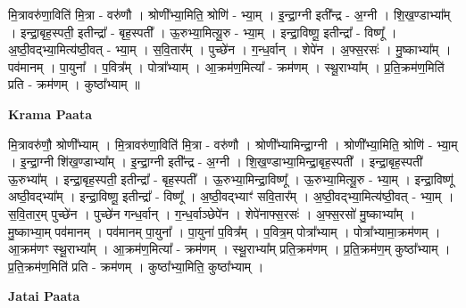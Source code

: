 \documentclass[17pt]{extarticle}
\begin{document}
मि॒त्रावरु॑णा॒विति॑ मि॒त्रा - वरु॑णौ । श्रोणी᳚भ्या॒मिति॒ श्रोणि॑ - भ्या॒म् । इ॒न्द्रा॒ग्नी इती᳚न्द्र - अ॒ग्नी । शि॒ख॒ण्डाभ्या᳚म् । इन्द्रा॒बृह॒स्पती॒ इतीन्द्रा᳚ - बृह॒स्पती᳚ । ऊ॒रुभ्या॒मित्यू॒रु - भ्या॒म् । इन्द्रा॒विष्णू॒ इतीन्द्रा᳚ - विष्णू᳚ । अ॒ष्ठी॒वद्भ्या॒मित्य॑ष्ठी॒वत् - भ्या॒म् । स॒वि॒तार᳚म् । पुच्छे॑न । ग॒न्ध॒र्वान् । शेपे॑न । अ॒फ्स॒रसः॑ । मु॒ष्काभ्या᳚म् । पव॑मानम् । पा॒युना᳚ । प॒वित्र᳚म् । पोत्रा᳚भ्याम् । आ॒क्रम॑ण॒मित्या᳚ - क्रम॑णम् । स्थू॒राभ्या᳚म् । प्र॒ति॒क्रम॑ण॒मिति॑ प्रति - क्रम॑णम् । कुष्ठा᳚भ्याम् ॥  \newline


\textbf{Krama Paata} \newline

मि॒त्रावरु॑णौ॒ श्रोणी᳚भ्याम् । मि॒त्रावरु॑णा॒विति॑ मि॒त्रा - वरु॑णौ । श्रोणी᳚भ्यामिन्द्रा॒ग्नी । श्रोणी᳚भ्या॒मिति॒ श्रोणि॑ - भ्या॒म् । इ॒न्द्रा॒ग्नी शि॑ख॒ण्डाभ्या᳚म् । इ॒न्द्रा॒ग्नी इती᳚न्द्र - अ॒ग्नी । शि॒ख॒ण्डाभ्या॒मिन्द्रा॒बृह॒स्पती᳚ । इन्द्रा॒बृह॒स्पती॑ ऊ॒रुभ्या᳚म् । इन्द्रा॒बृह॒स्पती॒ इतीन्द्रा᳚ - बृह॒स्पती᳚ । ऊ॒रुभ्या॒मिन्द्रा॒विष्णू᳚ । ऊ॒रुभ्या॒मित्यू॒रु - भ्या॒म् । इन्द्रा॒विष्णू॑ अष्ठी॒वद्भ्या᳚म् । इन्द्रा॒विष्णू॒ इतीन्द्रा᳚ - विष्णू᳚ । अ॒ष्ठी॒वद्भ्याꣳ॑ सवि॒तार᳚म् । अ॒ष्ठी॒वद्भ्या॒मित्य॑ष्ठी॒वत् - भ्या॒म् । स॒वि॒तार॒म् पुच्छे॑न । पुच्छे॑न गन्ध॒र्वान् । ग॒न्ध॒र्वाञ्छेपे॑न । शेपे॑नाफ्स॒रसः॑ । अ॒फ्स॒रसो॑ मु॒ष्काभ्या᳚म् । मु॒ष्काभ्या॒म् पव॑मानम् । पव॑मानम् पा॒युना᳚ । पा॒युना॑ प॒वित्र᳚म् । प॒वित्र॒म् पोत्रा᳚भ्याम् । पोत्रा᳚भ्यामा॒क्रम॑णम् । आ॒क्रम॑णꣳ स्थू॒राभ्या᳚म् । आ॒क्रम॑ण॒मित्या᳚ - क्रम॑णम् । स्थू॒राभ्या᳚म् प्रति॒क्रम॑णम् । प्र॒ति॒क्रम॑ण॒म् कुष्ठा᳚भ्याम् । प्र॒ति॒क्रम॑ण॒मिति॑ प्रति - क्रम॑णम् । कुष्ठा᳚भ्या॒मिति॒ कुष्ठा᳚भ्याम् । \newline

\textbf{Jatai Paata} \newline
\end{document}
